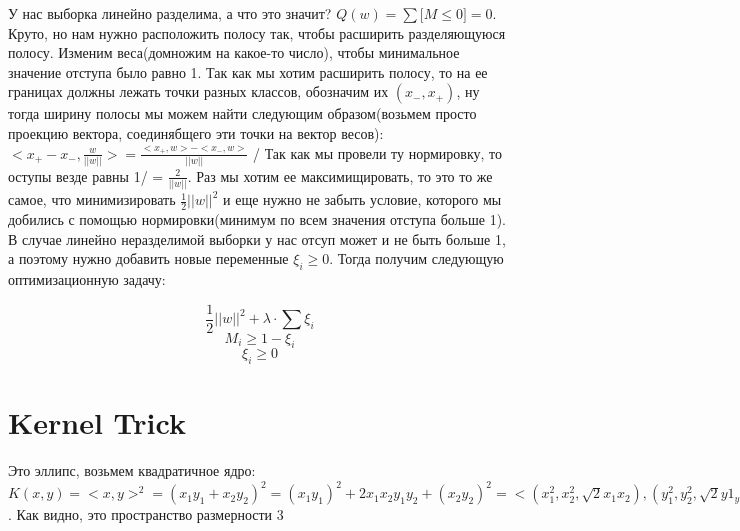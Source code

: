 \documentclass{article}
\theoremstyle{plain}
\theoremstyle{definition}
\begin{document}
	У нас выборка линейно разделима, а что это значит? 
	$Q(w) = \sum \lbrack M \leq 0 \rbrack = 0$. Круто, но нам нужно расположить полосу так, чтобы расширить разделяющуюся полосу. Изменим веса(домножим на какое-то число), чтобы минимальное значение отступа было равно 1. Так как мы хотим расширить полосу, то на ее границах должны лежать точки разных классов, обозначим их $(x_-, x_+)$, ну тогда ширину полосы мы можем найти следующим образом(возьмем просто проекцию вектора, соединябщего эти точки на вектор весов): $<x_+ - x_-, \frac{w}{||w||}> = \frac{<x_+, w> - <x_-, w>}{||w||}$ / Так как мы провели ту нормировку, то оступы везде равны 1/ = $\frac{2}{||w||}$. Раз мы хотим ее максимищировать, то это то же самое, что минимизировать $\frac{1}{2} ||w||^2$ и еще нужно не забыть условие, которого мы добились с помощью нормировки(минимум по всем значения отступа больше 1). В случае линейно неразделимой выборки у нас отсуп может и не быть больше 1, а поэтому нужно добавить новые переменные $\xi_i \geq 0$. Тогда получим следующую оптимизационную задачу:
	
	$$\frac{1}{2}||w||^2 + \lambda \cdot \sum \xi_i$$
	$$M_i \geq 1 - \xi_i$$
	$$\xi_i \geq 0$$
	
\section{Kernel Trick}

Это эллипс, возьмем квадратичное ядро: $K(x, y) = <x,y>^2 = (x_1y_1 + x_2y_2)^2 = (x_1y_1)^2 + 2x_1x_2y_1y_2 + (x_2y_2)^2 = <(x_1^2,x_2^2 , \sqrt{2}x_1x_2), (y_1^2, y_2^2, \sqrt{2}y1_y1)>$. Как видно, это пространство размерности 3
\end{document}
